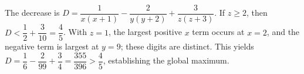 The decrease is $D=\dfrac{1}{x(x+1)}-\dfrac{2}{y(y+2)}+\dfrac{3}{z(z+3)}$. If $z\ge2$, then $D<\dfrac{1}{2}+\dfrac{3}{10}=\dfrac{4}{5}$. With $z=1$, the largest positive $x$ term occurs at $x=2$, and the negative term is largest at $y=9$; these digits are distinct. This yields $D=\dfrac{1}{6}-\dfrac{2}{99}+\dfrac{3}{4}=\boxed{\dfrac{355}{396}}>\dfrac{4}{5}$, establishing the global maximum.
